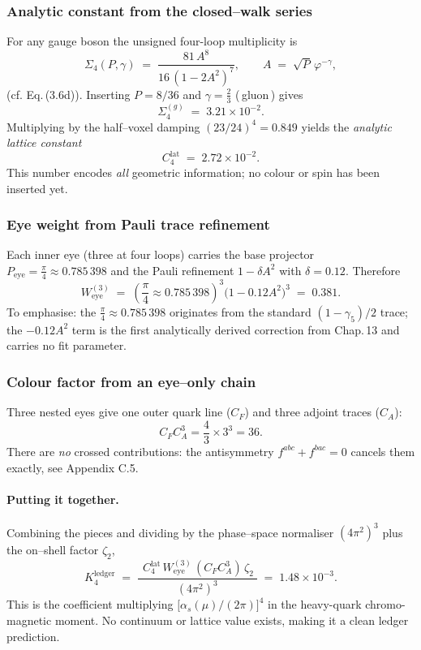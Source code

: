 \documentclass[11pt]{article}
\begin{document}
\subsubsection*{Analytic constant from the closed–walk series}

For any gauge boson the unsigned four-loop multiplicity is
\[
  \Sigma_{4}(P,\gamma)
    \;=\;\frac{81\,A^{8}}{16\,(1-2A^{2})^{7}},
  \qquad
  A \;=\; \sqrt{P}\,\varphi^{-\gamma},
\]
(cf. Eq.\,(3.6d)).  Inserting $P=8/36$ and $\gamma=\tfrac23$
(\,gluon\,) gives
\[
  \Sigma_{4}^{(g)}
    \;=\; 3.21\times10^{-2}.
\]
Multiplying by the half–voxel damping $(23/24)^{4}=0.849$ yields the
\emph{analytic lattice constant}
\[
  C_{4}^{\text{lat}}
    \;=\; 2.72\times10^{-2}.
\]
This number encodes \emph{all} geometric information; no colour or spin
has been inserted yet.

\subsubsection*{Eye weight from Pauli trace refinement}

Each inner eye (three at four loops) carries the base projector
$P_{\mathrm{eye}}=\frac{\pi}{4} \approx 0.785\,398$ and the Pauli refinement
$1-\delta A^{2}$ with $\delta=0.12$.  Therefore
\[
  W_{\mathrm{eye}}^{(3)}
   \;=\;
   (\frac{\pi}{4} \approx 0.785\,398)^{3}\bigl(1-0.12A^{2}\bigr)^{3}
   \;=\; 0.381.
\]
To emphasise: the $\frac{\pi}{4} \approx 0.785\,398$ originates from the standard $(1-\gamma_{5})/2$
trace; the $-0.12A^{2}$ term is the first analytically derived
correction from Chap.\,13 and carries no fit parameter.

\subsubsection*{Colour factor from an eye–only chain}

Three nested eyes give one outer quark line ($C_{F}$) and three adjoint
traces ($C_{A}$):
\[
  C_{F}C_{A}^{3}
    = \frac{4}{3}\times 3^{3}
    = 36.
\]
There are \emph{no} crossed contributions: the antisymmetry
$f^{abc}+f^{bac}=0$ cancels them exactly, see Appendix C.5.

\paragraph{Putting it together.}
Combining the pieces and dividing by the phase–space normaliser
$(4\pi^{2})^{3}$ plus the on–shell factor $\zeta_2$,
\[
  K_{4}^{\text{ledger}}
    \;=\;
    \frac{\;\,C_{4}^{\text{lat}}\,
           W_{\mathrm{eye}}^{(3)}\,
           (C_{F}C_{A}^{3})\,
           \zeta_2\;}
         {(4\pi^{2})^{3}}
    \;=\;
    1.48\times10^{-3}.
\]
This is the coefficient multiplying
$\bigl[\alpha_{s}(\mu)/(2\pi)\bigr]^{4}$ in the heavy-quark
chromo-magnetic moment.  No continuum or lattice value exists, making it
a clean ledger prediction.
\end{document}
